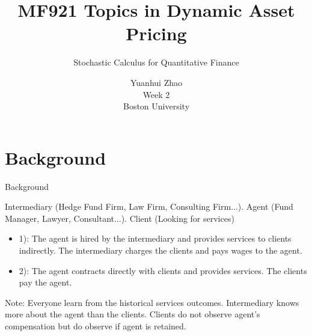 \documentclass{beamer}
\title{MF921 Topics in Dynamic Asset Pricing}
\author{Stochastic Calculus for Quantitative Finance}
\date{Yuanhui Zhao\\Week 2\\Boston University}
\begin{document}
\frame{\titlepage}
\section{Background}
\begin{frame}{Background}
\par Intermediary (Hedge Fund Firm, Law Firm, Consulting Firm...). Agent (Fund Manager, Lawyer, Consultant...). Client (Looking for services)
\vspace{2em}
\begin{itemize}
    \item 1): The agent is hired by the intermediary and provides services to clients indirectly. The intermediary charges the clients and pays wages to the agent.
    \vspace{1em}
    \item 2): The agent contracts directly with clients and provides services. The clients pay the agent.
\end{itemize}
\vspace{1em}
\par Note: Everyone learn from the historical services outcomes. Intermediary knows more about the agent than the clients. Clients do not observe agent's compensation but do observe if agent is retained.
\end{frame}
\end{document}
